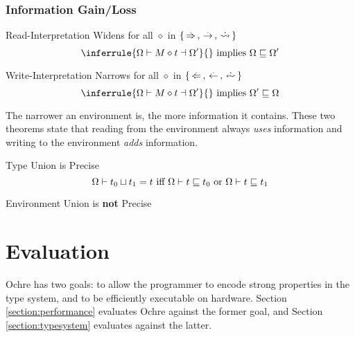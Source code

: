 \documentclass[12pt,twoside]{report}
\begin{document}
\subsection{Information Gain/Loss}
\begin{Property}{Read-Interpretation Widens}{}
  for all $\diamond$ in $\{ \,\stackrel{.}{\Rightarrow}\,, \,\stackrel{.}{\rightarrow}\,, \,\dot{\rightsquigarrow}\, \}$
  \[
    \inferrule{
      \Omega \vdash M \diamond t \dashv \Omega'
    }{}
    \text{   implies   }
    \Omega \subtype \Omega'
  \]
\end{Property}
\label{theorem:expressionreadwidens}


\begin{Property}{Write-Interpretation Narrows}{}
  for all $\diamond$ in $\{ \writearrowabs, \narrowarrowabs, \erasedwritearrow \}$
  \[
    \inferrule{
      \Omega \vdash M \diamond t \dashv \Omega'
    }{}
    \text{   implies   }
    \Omega' \subtype \Omega
  \]
\end{Property}
\label{theorem:expressionwritewidens}

The narrower an environment is, the more information it contains. These two theorems state that reading from the environment always \textit{uses} information and writing to the environment \textit{adds} information.

\begin{Property}{Type Union is Precise}{}
  \[
    \Omega \vdash t_0 \sqcup t_1 = t
    \text{   iff   }
    \Omega \vdash t \sqsubseteq t_0
    \text{   or   } 
    \Omega \vdash t \sqsubseteq t_1
  \]
\end{Property}
\label{theorem:precisetypeunion}

\begin{Property}{Environment Union is \textbf{not} Precise}{}
\end{Property}
\label{theorem:inpreciseenvunion}


\chapter{Evaluation}
Ochre has two goals: to allow the programmer to encode strong properties in the type system, and to be efficiently executable on hardware. Section \ref{section:performance} evaluates Ochre against the former goal, and Section \ref{section:typesystem} evaluates against the latter.
\end{document}
